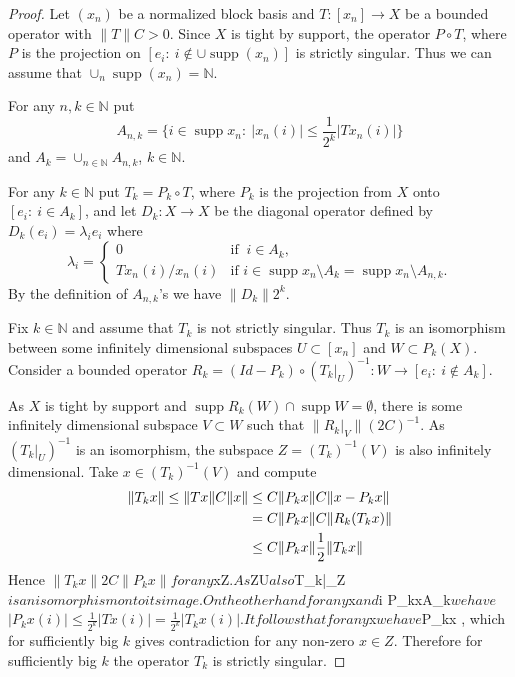 \documentclass{amsart}
\numberwithin{subsection}{section}
\numberwithin{equation}{section}
\begin{document}
\begin{proof} Let $(x_n)$ be a normalized block basis and $T:[x_n]\to X$ be a bounded operator  with ${\lVert T\rVert}C>0$.  Since $X$ is tight by support, the operator $P\circ T$, where $P$ is the projection on $[e_i:\ i\not\in \cup\operatorname{supp}(x_{n})]$ is strictly singular. Thus we can assume that $\cup_{n}\operatorname{supp}(x_n)={{\mathbb{N}}}$.

For any $n,k\in{{\mathbb{N}}}$ put 
$$
A_{n,k}=\{i\in\operatorname{supp} x_n: \ |x_n(i)|\leq \frac{1}{2^k}|Tx_n(i)|\}
$$ 
and $A_k=\cup_{n\in{{\mathbb{N}}}}A_{n,k}$, $k\in{{\mathbb{N}}}$. 

For any $k\in{{\mathbb{N}}}$ put $T_k=P_k\circ T$, where $P_k$ is the projection from $X$ onto $[e_i: \ i\in A_k]$, and let $D_k: X\to X$ be the diagonal operator defined by $D_{k}(e_{i})=\lambda_{i}e_{i}$ where 
$$
\lambda_{i}=\begin{cases}0\,\,\, &\textrm{if}\,\,\ i\in A_k,\\
Tx_n(i)/x_n(i) &\textrm{if}\,\, i\in\operatorname{supp} x_n\setminus A_k=\operatorname{supp}
x_n\setminus A_{n,k}.
\end{cases}
$$ 
By the definition of $A_{n,k}$'s we have ${\lVert D_k\rVert} 2^k$. 

Fix $k\in{{\mathbb{N}}}$ and assume that $T_k$ is not strictly singular. Thus $T_k$ is an isomorphism between some infinitely dimensional subspaces $U\subset [x_n]$ and $W\subset P_k(X)$. Consider a bounded operator $R_k=(Id-P_k)\circ (T_k|_U)^{-1}: W\to [e_i: \ i\not\in A_k]$.

As $X$ is tight by support and $\operatorname{supp} R_k(W)\cap \operatorname{supp} W=\emptyset$, there is some infinitely dimensional subspace $V\subset W$ such that ${\lVert R_k|_V\rVert} (2C)^{-1}$. As $(T_k|_U)^{-1}$ is an isomorphism, the subspace $Z=(T_k)^{-1}(V)$ is also infinitely dimensional. Take $x\in (T_k)^{-1}(V)$ and compute 
\begin{align*}
{\lVert T_kx\rVert}\leq {\lVert Tx\rVert} C{\lVert x\rVert}
&\leq C{\lVert P_kx\rVert}C{\lVert x-P_kx\rVert}
\\ 
&=C{\lVert P_kx\rVert}C{\lVert R_k(T_kx)\rVert} 
\\
&\leq C{\lVert P_kx\rVert}\frac{1}{2}{\lVert T_kx\rVert}
\notag
\end{align*}
Hence ${\lVert T_kx\rVert} 2C{\lVert P_kx\rVert} for any $x\in Z$. As $Z\subset U$ also $T_k|_Z$ is an isomorphism onto its image.

On the other hand for any $x\in [x_n]$ and $i\in {} P_kx\subset A_k$ we have 
$$
|P_kx(i)|\leq \frac{1}{2^k}|Tx(i)|=\frac{1}{2^k}|T_kx(i)|.
$$ 
It follows that for any $x\in [x_n]$ we have ${\lVert P_kx\rVert} , which for sufficiently big $k$ gives contradiction for any non-zero $x\in Z$. Therefore for sufficiently big $k$ the operator $T_k$ is strictly singular. 


\end{proof}
\end{document}

